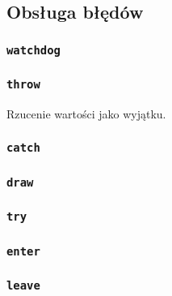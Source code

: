 \subsection{Obsługa błędów}
\label{viua_vm_ops_error_handling}

\subsubsection{\texttt{watchdog}}

\subsubsection{\texttt{throw}}

Rzucenie wartości jako wyjątku.

\subsubsection{\texttt{catch}}
\subsubsection{\texttt{draw}}
\subsubsection{\texttt{try}}
\subsubsection{\texttt{enter}}
\subsubsection{\texttt{leave}}
